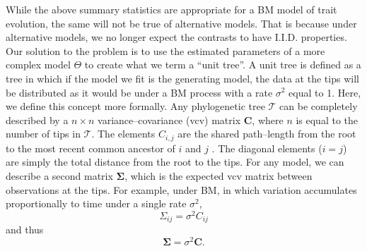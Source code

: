 \documentclass[12pt]{article}
\begin{document}
While the above summary statistics are appropriate for a BM model of trait evolution, the same will not be true of alternative models. That is because under alternative models, we no longer expect the contrasts to have I.I.D. properties. Our solution to the problem is to use the estimated parameters of a more complex model $\Theta$ to create what we term a ``unit tree''. A unit tree is defined as a tree in which if the model we fit is the generating model, the data at the tips will be distributed as it would be under a BM process with a rate $\sigma^2$ equal to 1. Here, we define this concept more formally. Any phylogenetic tree $\mathcal{T}$ can be completely described by a $n \times n$ variance--covariance (vcv) matrix $\mathbf{C}$, where $n$ is equal to the number of tips in $\mathcal{T}$. The elements $C_{i,j}$ are the shared path--length from the root to the most recent common ancestor of $i$ and $j$ \citep{Piazza1975}. The diagonal elements ($i = j$) are simply the total distance from the root to the tips. For any model, we can describe a second matrix $\mathbf{\Sigma}$, which is the expected vcv matrix between observations at the tips. For example, under BM, in which variation accumulates proportionally to time under a single rate $\sigma^2$, 
\begin{equation}
\Sigma_{ij} = \sigma^2 C_{ij}
\end{equation}
and thus
\begin{equation}
\mathbf{\Sigma} = \sigma^2 \mathbf{C}.
\end{equation}
\end{document}
